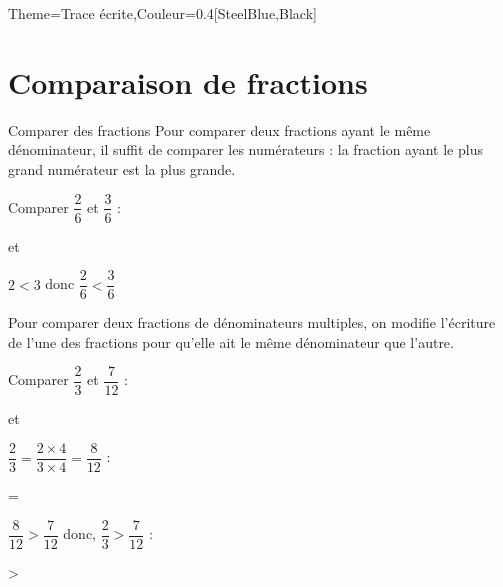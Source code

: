 \begin{Maquette}[Cours]{Theme={Trace écrite},Couleur={0.4[SteelBlue,Black]}}
   \section{Comparaison de fractions}

      \begin{methode*}{Comparer des fractions}
         Pour comparer deux fractions ayant le même dénominateur, il suffit de comparer les numérateurs : la fraction ayant le plus grand numérateur est la plus grande.
         \begin{exmethode}
            Comparer $\dfrac26$ et $\dfrac36$ \; : \; \parbox{1.4cm}{} et \; \parbox{1.2cm}{}
            \tcblower
               $2<3$ donc $\dfrac26<\dfrac36$
         \end{exmethode}
         Pour comparer deux fractions de dénominateurs multiples, on modifie l'écriture de l'une des fractions pour qu'elle ait le même dénominateur que l'autre.
         \begin{exmethode}
            Comparer $\dfrac23$ et $\dfrac{7}{12}$ \; : \; \parbox{1.4cm}{} et \; \parbox{1.2cm}{}
            \tcblower
               $\dfrac23=\dfrac{2\times4}{3\times4}=\dfrac{8}{12}$ \; : \; \parbox{1.4cm}{} = \; \parbox{1.2cm}{} \par \medskip
               $\dfrac{8}{12}>\dfrac{7}{12}$ donc, $\dfrac23>\dfrac{7}{12}$ \; : \; \parbox{1.4cm}{} > \; \parbox{1.2cm}{}
         \end{exmethode}
      \end{methode*}

\end{Maquette}


